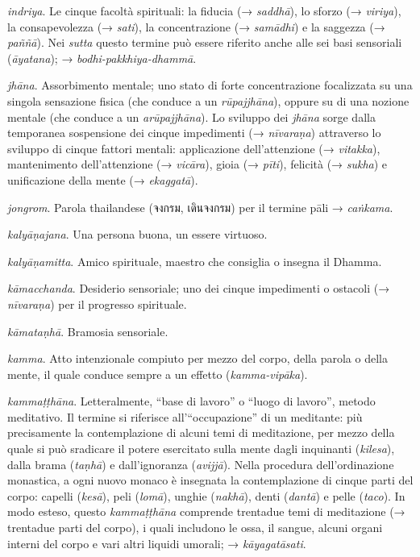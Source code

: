 \emph{indriya}. Le cinque facoltà spirituali: la fiducia (→
\emph{saddhā}), lo sforzo (→ \emph{viriya}), la consapevolezza (→
\emph{sati}), la concentrazione (→ \emph{samādhi}) e la saggezza (→
\emph{paññā}). Nei \emph{sutta} questo termine può essere riferito anche
alle sei basi sensoriali (\emph{āyatana}); →
\emph{bodhi-pakkhiya-dhammā}.

\emph{jhāna}. Assorbimento mentale; uno stato di forte concentrazione
focalizzata su una singola sensazione fisica (che conduce a un
\emph{rūpajjhāna}), oppure su di una nozione mentale (che conduce a un
\emph{arūpajjhāna}). Lo sviluppo dei \emph{jhāna} sorge dalla temporanea
sospensione dei cinque impedimenti (→ \emph{nīvaraṇa}) attraverso lo
sviluppo di cinque fattori mentali: applicazione dell'attenzione (→
\emph{vitakka}), mantenimento dell'attenzione (→ \emph{vicāra}), gioia
(→ \emph{pīti}), felicità (→ \emph{sukha}) e unificazione della mente (→
\emph{ekaggatā}).

\emph{jongrom}. Parola thailandese (จงกรม, เดินจงกรม) per il termine
pāli → \emph{caṅkama}.

\emph{kalyāṇajana}. Una persona buona, un essere virtuoso.

\emph{kalyāṇamitta}. Amico spirituale, maestro che consiglia o insegna
il Dhamma.

\emph{kāmacchanda}. Desiderio sensoriale; uno dei cinque impedimenti o
ostacoli (→ \emph{nīvaraṇa}) per il progresso spirituale.

\emph{kāmataṇhā}. Bramosia sensoriale.

\emph{kamma}. Atto intenzionale compiuto per mezzo del corpo, della
parola o della mente, il quale conduce sempre a un effetto
(\emph{kamma-vipāka}).

\emph{kammaṭṭhāna}. Letteralmente, ``base di lavoro'' o ``luogo di
lavoro'', metodo meditativo. Il termine si riferisce all'``occupazione''
di un meditante: più precisamente la contemplazione di alcuni temi di
meditazione, per mezzo della quale si può sradicare il potere esercitato
sulla mente dagli inquinanti (\emph{kilesa}), dalla brama (\emph{taṇhā})
e dall'ignoranza (\emph{avijjā}). Nella procedura dell'ordinazione
monastica, a ogni nuovo monaco è insegnata la contemplazione di cinque
parti del corpo: capelli (\emph{kesā}), peli (\emph{lomā}), unghie
(\emph{nakhā}), denti (\emph{dantā}) e pelle (\emph{taco}). In modo
esteso, questo \emph{kammaṭṭhāna} comprende trentadue temi di
meditazione (→ trentadue parti del corpo), i quali includono le ossa, il
sangue, alcuni organi interni del corpo e vari altri liquidi umorali; →
\emph{kāyagatāsati}.

